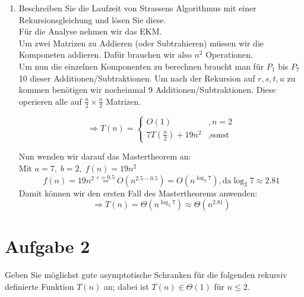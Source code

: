 \documentclass[11pt,a4paper,ngerman]{article}
\begin{document}
\begin{enumerate}[\bfseries (a)]
\item Beschreiben Sie die Laufzeit von Strassens Algorithmus mit einer Rekursionsgleichung und lösen Sie diese.\\

Für die Analyse nehmen wir das EKM.\\
Um zwei Matrizen zu Addieren (oder Subtrahieren) müssen wir die Komponeten addieren. Dafür brauchen wir also $n^2$ Operationen.\\
Um nun die einzelnen Komponenten zu berechnen braucht man für $P_1$ bis $P_7$ 10 dieser Additionen/Subtraktionen. Um nach der Rekursion auf $r,s,t,u$ zu kommen benötigen wir nocheinmal 9 Additionen/Subtraktionen. Diese operieren alle auf $\frac{n}{2}\times\frac{n}{2}$ Matrizen.

$$
\Rightarrow T(n) = \left\{ 
\begin{array}{lr}
O(1)&,n = 2\\
7 T(\frac{n}{2}) + 19n^2&,\text{sonst}
\end{array}
\right.
$$

Nun wenden wir darauf das Mastertheorem an:\\
Mit $a=7, \; b=2, \; f(n) = 19n^2$\\
$$
f(n) = 19n^2 \stackrel{\varepsilon = 0.5}{=} O(n^{2.5 - 0.5}) =O( n^{\log_2 7}), \text{da} \log_2 7 \approx 2.81
$$
Damit können wir den ersten Fall des Mastertheorems anwenden:
$$
\Rightarrow T(n) = \Theta \left( n^{\log_2 7} \right) \approx \Theta \left( n^{2.81} \right)
$$
\end{enumerate}

\section*{Aufgabe 2}
Geben Sie möglichst gute asymptotische Schranken für die folgenden rekursiv definierte Funktion $T(n)$ an; dabei ist $T(n) \in \Theta(1)$ für $n \leq 2$.
\end{document}
